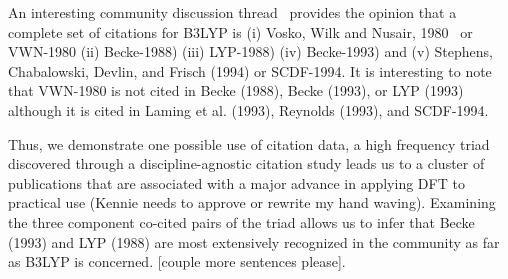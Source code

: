 \documentclass[11pt, oneside]{article}   	%
\begin{document}
An interesting community discussion thread~\citep{johansson2002} provides the opinion that a complete set of citations for B3LYP is (i) Vosko, Wilk and Nusair, 1980~\citep{vosko1980accurate} or VWN-1980 (ii) Becke-1988) (iii) LYP-1988) (iv) Becke-1993) and (v) Stephens, Chabalowski, Devlin, and Frisch (1994) or SCDF-1994. It is interesting to note that VWN-1980  is not cited in Becke (1988), Becke (1993), or LYP (1993) although it is cited in Laming et al. (1993), Reynolds (1993), and SCDF-1994.

Thus, we demonstrate one possible use of citation data, a high frequency triad discovered through a discipline-agnostic citation study leads us to a cluster of publications that are associated with a major advance in applying DFT to practical use (Kennie needs to approve or rewrite my hand waving). Examining the three component co-cited pairs of the triad allows us to infer that Becke (1993) and LYP (1988) are most extensively recognized in the community as far as B3LYP is concerned. [couple more sentences please].



\end{document}
